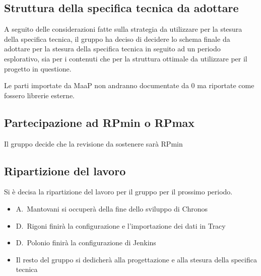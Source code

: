 \subsection{Struttura della specifica tecnica da adottare}

A seguito delle considerazioni fatte sulla strategia da utilizzare per la stesura della specifica tecnica, il gruppo ha deciso di decidere lo schema finale da adottare per la stesura della specifica tecnica in seguito ad un periodo esplorativo, sia per i contenuti che per la struttura ottimale da utilizzare per il progetto in questione.

Le parti importate da MaaP non andranno documentate da 0 ma riportate come fossero librerie esterne.

\subsection{Partecipazione ad RPmin o RPmax}

Il gruppo decide che la revisione da sostenere sarà RPmin

\subsection{Ripartizione del lavoro}

Si è decisa la ripartizione del lavoro per il gruppo per il prossimo periodo.

\begin{itemize}
\item A.~Mantovani si occuperà della fine dello sviluppo di Chronos
\item D.~Rigoni finirà la configurazione e l'importazione dei dati in Tracy
\item D.~Polonio finirà la configurazione di Jenkins
\item Il resto del gruppo si dedicherà alla progettazione e alla stesura della specifica tecnica
\end{itemize}




